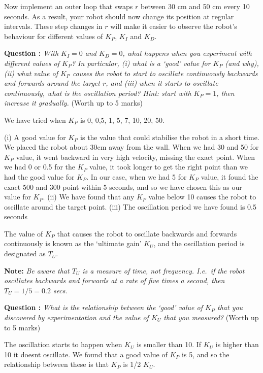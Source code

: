 \documentclass[hidelinks,a4paper,11pt]{article}
\newcounter{question}
\newcommand\myq{\refstepcounter{question}\thequestion}
\begin{document}
	Now implement an outer loop that swaps $r$ between 30 cm and 50 cm every 10 seconds.  As a result, your robot should now change its position at regular intervals.  These step changes in $r$ will make it easier to observe the robot's behaviour for different values of $K_P$, $K_I$ and $K_D$.
	
	{\bfseries Question \myq:}  \emph{With $K_I=0$ and $K_D=0$, what happens when you experiment with different values of $K_P$?  In particular, (i) what is a `good' value for $K_P$ (and why), (ii) what value of $K_P$ causes the robot to start to oscillate continuously backwards and forwards around the target $r$, and (iii) when it starts to oscillate continuously, what is the oscillation period?  Hint: start with $K_P =1$, then increase it gradually.} (Worth up to 5 marks)\\
	\begin{mdframed}
		We have tried when $K_P$ is 0, 0,5, 1, 5, 7, 10, 20, 50.
		
		(i) A good value for $K_P$ is the value that could stabilise the robot in a short time. We placed the robot about 30cm away from the wall. When we had 30 and 50 for $K_P$ value, it went backward in very high velocity, missing the exact point. When we had 0 or 0.5 for the $K_P$ value, it took longer to get the right point than we had the good value for $K_P$. In our case, when we had 5 for $K_P$ value, it found the exact 500 and 300 point within 5 seconds, and so we have chosen this as our value for $K_P$.
		(ii) We have found that any  $K_P$ value below 10 causes the robot to oscillate around the target point.
		(iii) The oscillation period we have found is 0.5 seconds
	\end{mdframed}
	\vspace*{\baselineskip}
	
	The value of $K_P$ that causes the robot to oscillate backwards and forwards continuously is known as the `ultimate gain' $K_U$, and the oscillation period is designated as $T_U$.
	
	{\bfseries Note:}  \emph{Be aware that $T_U$ is a measure of time, not frequency.  I.e.\ if the robot oscillates backwards and forwards at a rate of five times a second, then $T_U=1/5=0.2$ secs.}
	
	{\bfseries Question \myq:}  \emph{What is the relationship between the `good' value of $K_P$ that you discovered by experimentation and the value of $K_U$ that you measured?} (Worth up to 5 marks)\\
	\begin{mdframed}
		
		The oscillation starts to happen when $K_U$ is smaller than 10. If $K_U$ is higher than 10 it doesnt oscillate.
		We found that a good value of $K_P$ is 5, and so the relationship between these is that $K_P$ is 1/2 $K_U$.
	\end{mdframed}
	\vspace*{\baselineskip}
	
\end{document}
